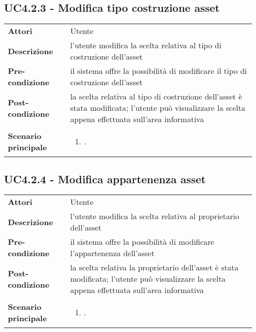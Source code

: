 \subsection{UC4.2.3 - Modifica tipo costruzione asset} 
\label{sssec:UC4.2.3} 
\def\arraystretch{1.5}
\begin{tabularx}{\textwidth}{l|p{}}
	\rowcolor{I} \multicolumn{2}{c}{\color{white}\textbf{UC4.2.3 - Modifica tipo costruzione asset}} \\
	\toprule
	\endhead
	\textbf{Attori} & Utente\\
	\textbf{Descrizione} & l'utente modifica la scelta relativa al tipo di costruzione dell'asset\\
	\textbf{Pre-condizione} & il sistema offre la possibilità di modificare il tipo di costruzione dell'asset\\
	\textbf{Post-condizione} & la scelta relativa al tipo di costruzione dell'asset è stata modificata; l'utente può visualizzare la scelta appena effettuata sull'area informativa\\
	\textbf{Scenario principale} & \vspace{-1.2em}\begin{enumerate}[leftmargin=*,noitemsep,nosep]
		\item \nameref{sssec:UC4.2.3}.
	\end{enumerate}\\
	\bottomrule
\end{tabularx}
\subsection{UC4.2.4 - Modifica appartenenza asset} 
\label{sssec:UC4.2.4} 
\def\arraystretch{1.5}
\begin{tabularx}{\textwidth}{l|p{}}
	\rowcolor{I} \multicolumn{2}{c}{\color{white}\textbf{UC4.2.4 - Modifica appartenenza asset}} \\
	\toprule
	\endhead
	\textbf{Attori} & Utente\\
	\textbf{Descrizione} & l'utente modifica la scelta relativa al proprietario dell'asset\\
	\textbf{Pre-condizione} & il sistema offre la possibilità di modificare l'appartenenza dell'asset\\
	\textbf{Post-condizione} & la scelta relativa la proprietario dell'asset è stata modificata; l'utente può visualizzare la scelta appena effettuata sull'area informativa\\
	\textbf{Scenario principale} & \vspace{-1.2em}\begin{enumerate}[leftmargin=*,noitemsep,nosep]
		\item \nameref{sssec:UC4.2.4}.
	\end{enumerate}\\
	\bottomrule
\end{tabularx}
